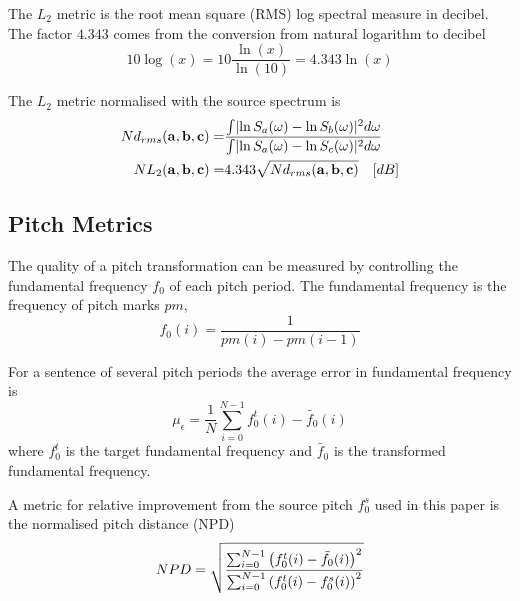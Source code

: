 \begin{remark}
	The $L_2$ metric is the root mean square (RMS) log spectral measure in decibel. The factor $4.343$ comes from the conversion from natural logarithm to decibel
	\begin{equation}
		10\log(x) = 10 \frac{\ln(x)}{\ln(10)} = 4.343\ln(x) 
	\end{equation}	
\end{remark}

The $L_2$ metric normalised with the source spectrum is
\begin{equation}
	\begin{split}
	Nd_{rms}(\mathbf{a},\mathbf{b},\mathbf{c}) = & \frac{\int \lvert\ln S_a(\omega)-\ln S_b(\omega)\rvert^2 d\omega}{\int \lvert\ln S_a(\omega)-\ln S_c(\omega)\rvert^2 d\omega}  \\
	NL_2(\mathbf{a},\mathbf{b},\mathbf{c}) = & 4.343 \sqrt{Nd_{rms}(\mathbf{a},\mathbf{b},\mathbf{c})} \quad [dB]
	\end{split}
\end{equation}

\subsection{Pitch Metrics} %
\label{sub:pitch_metrics}
The quality of a pitch transformation can be measured by controlling the fundamental frequency $f_0$ of each pitch period. The fundamental frequency is the frequency of pitch marks $pm$, \ie 
\begin{equation}
	f_0(i) = \frac{1}{pm(i)-pm(i-1)}
\end{equation}

For a sentence of several pitch periods the average error in fundamental frequency is
\begin{equation}
	\mu_{\epsilon} = \frac{1}{N}\sum_{i=0}^{N-1} f_0^t(i) - \tilde{f_0}(i)
\end{equation}
where $f_0^t$ is the target fundamental frequency and $\tilde{f_0}$ is the transformed fundamental frequency.

A metric for relative improvement from the source pitch $f_0^s$ used in this paper is the normalised pitch distance (NPD) \cite{najjary04}
\begin{equation}
	NPD = \sqrt{\frac{\sum_{i=0}^{N-1} \left(f_0^t(i)-\tilde{f_0}(i)\right)^2}{\sum_{i=0}^{N-1} \left(f_0^t(i)-f_0^s(i)\right)^2}}
\end{equation}



